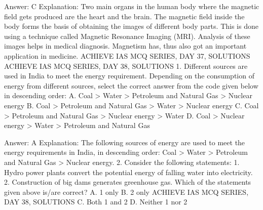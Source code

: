 Answer: C
Explanation: Two main organs in the human body where the magnetic field gets produced are the heart and the brain. The magnetic field inside the body forms the basis of obtaining the images of different body parts. This is done using a technique called Magnetic Resonance Imaging (MRI). Analysis of these images helps in medical diagnosis. Magnetism has, thus also got an important application in medicine. ACHIEVE IAS MCQ SERIES, DAY 37, SOLUTIONS ACHIEVE IAS MCQ SERIES, DAY 38, SOLUTIONS 1. Different sources are used in India to meet the energy requirement. Depending on the consumption of energy from different sources, select the correct answer from the code given below in descending order: A. Coal > Water > Petroleum and Natural Gas > Nuclear energy B. Coal > Petroleum and Natural Gas > Water > Nuclear energy C. Coal > Petroleum and Natural Gas > Nuclear energy > Water D. Coal > Nuclear energy > Water > Petroleum and Natural Gas 

Answer: A
Explanation: The following sources of energy are used to meet the energy requirements in India, in descending order: Coal > Water > Petroleum and Natural Gas > Nuclear energy. 2. Consider the following statements: 1. Hydro power plants convert the potential energy of falling water into electricity. 2. Construction of big dams generates greenhouse gas. Which of the statements given above is/are correct? A. 1 only B. 2 only ACHIEVE IAS MCQ SERIES, DAY 38, SOLUTIONS C. Both 1 and 2 D. Neither 1 nor 2 

